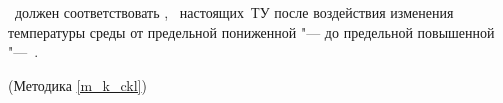 \dut \ должен соответствовать \treb, \trebafter \ настоящих~ТУ после воздействия изменения температуры среды от предельной пониженной "--- \kmmax до предельной повышенной "---~\kpmax.

\begin{flushright}
	(Методика \ref{m_k_ckl})
\end{flushright}

